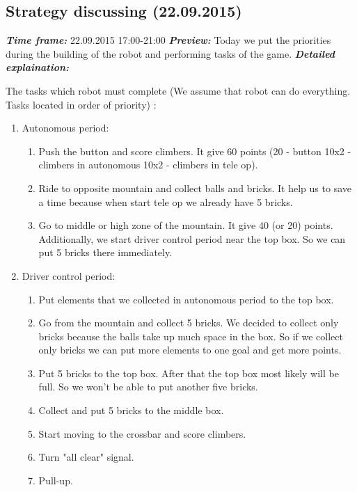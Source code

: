 \subsection{Strategy discussing (22.09.2015)}
\textit{\textbf{Time frame:}} 22.09.2015 17:00-21:00 \newline
\textit{\textbf{Preview:}} Today we put the priorities during the building of the robot and performing tasks of the game.\newline \newline
\textit{\textbf{Detailed explaination:}}
\begin{enumerate*}
	\item The tasks which robot must complete (We assume that robot can do everything. Tasks located in order of priority) :
	\begin{enumerate}
		\item Autonomous period:
		\begin{enumerate}
			\item Push the button and score climbers. It give 60 points (20 - button 10x2 - climbers in autonomous 10x2 - climbers in tele op).
			\item Ride to opposite mountain and collect balls and bricks. It help us to save a time because when start tele op we already have 5 bricks. 
			\item Go to middle or high zone of the mountain. It give 40 (or 20) points. Additionally, we start driver control period near the top box. So we can put 5 bricks there immediately.
		\end{enumerate}
		\item Driver control period:
		\begin{enumerate}
			\item Put elements that we collected in autonomous period to the top box.
			\item Go from the mountain and collect 5 bricks. We decided to collect only bricks because the balls take up much space in the box. So if we collect only bricks we can put more elements to one goal and get more points.
			\item Put 5 bricks to the top box. After that the top box most likely will be full. So we won't be able to put another five bricks.
			\item Collect and put 5 bricks to the middle box.
			\item Start moving to the crossbar and score climbers.
			\item Turn "all clear" signal.
			\item Pull-up.

\end{enumerate}
\end{enumerate}
\end{enumerate*}
